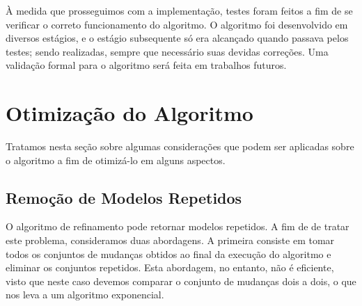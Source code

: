 \documentclass[normaltoc,capchap,capsec,times]{abnt}
\begin{document}
À medida que prosseguimos com a implementação, testes foram feitos a fim de se verificar o correto funcionamento do algoritmo. O algoritmo foi desenvolvido em diversos estágios, e o estágio subsequente só era alcançado quando passava pelos testes; sendo realizadas, sempre que necessário suas devidas correções. Uma validação formal para o algoritmo será feita em trabalhos futuros. 


\section{Otimização do Algoritmo}
\label{sec:otimizacao}

Tratamos nesta seção sobre algumas considerações que podem ser aplicadas sobre o algoritmo a fim de otimizá-lo em alguns aspectos.


\subsection{Remoção de Modelos Repetidos}

O algoritmo de refinamento pode retornar modelos repetidos. A fim de de tratar este problema, consideramos duas abordagens. A primeira consiste em tomar todos os conjuntos de mudanças obtidos ao final da execução do algoritmo e eliminar os conjuntos repetidos. Esta abordagem, no entanto, não é eficiente, visto que neste caso devemos comparar o conjunto de mudanças dois a dois, o que nos leva a um algoritmo exponencial.%
\end{document}
